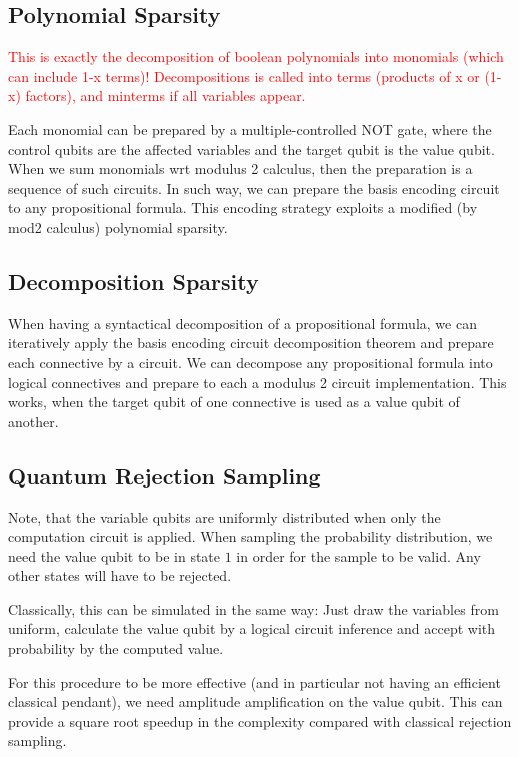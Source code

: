 \documentclass[aps,onecolumn,nofootinbib,pra]{article}
\newcommand{\red}[1]{\textcolor{red}{#1}}
\begin{document}
    \subsection{Polynomial Sparsity}

    \red{This is exactly the decomposition of boolean polynomials into monomials (which can include 1-x terms)!
    Decompositions is called into terms (products of x or (1-x) factors), and minterms if all variables appear.}

    Each monomial can be prepared by a multiple-controlled NOT gate, where the control qubits are the affected variables and the target qubit is the value qubit.
    When we sum monomials wrt modulus 2 calculus, then the preparation is a sequence of such circuits.
    In such way, we can prepare the basis encoding circuit to any propositional formula.
    This encoding strategy exploits a modified (by mod2 calculus) polynomial sparsity.

    \subsection{Decomposition Sparsity}

    When having a syntactical decomposition of a propositional formula, we can iteratively apply the basis encoding circuit decomposition theorem and prepare each connective by a circuit.
    We can decompose any propositional formula into logical connectives and prepare to each a modulus 2 circuit implementation.
    This works, when the target qubit of one connective is used as a value qubit of another.

    \subsection{Quantum Rejection Sampling}

    Note, that the variable qubits are uniformly distributed when only the computation circuit is applied.
    When sampling the probability distribution, we need the value qubit to be in state $1$ in order for the sample to be valid.
    Any other states will have to be rejected.

    Classically, this can be simulated in the same way: Just draw the variables from uniform, calculate the value qubit by a logical circuit inference and accept with probability by the computed value.

    For this procedure to be more effective (and in particular not having an efficient classical pendant), we need amplitude amplification on the value qubit.
    This can provide a square root speedup in the complexity compared with classical rejection sampling.
\end{document}

